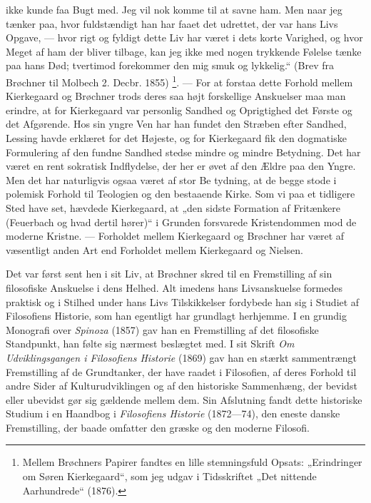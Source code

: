 \documentclass[12pt,a4paper,openany]{book}
\newcommand{\opage}[1]{\marginnote{\footnotesize\textit{[#1]}}}
\begin{document}
ikke kunde faa Bugt med. Jeg vil nok komme til at savne ham. Men naar jeg
tænker paa, hvor fuldstændigt han har faaet det udrettet, der var hans Livs
Opgave, --- hvor rigt og fyldigt dette Liv har været i dets korte Varighed, og
hvor Meget af ham der bliver tilbage, kan jeg ikke med nogen trykkende Følelse
tænke paa hans Død; tvertimod forekommer den mig smuk og lykkelig.“ (Brev fra
Brøchner til Molbech 2. Decbr. 1855)%
\footnote[1]{Mellem Brøchners Papirer fandtes en lille stemningsfuld Opsats:
„Erindringer om Søren Kierkegaard“, som jeg udgav i Tidsskriftet „Det nittende
Aarhundrede“ (1876).}. --- For at forstaa dette Forhold mellem Kierkegaard og
Brøchner trods deres saa højt forskellige Anskuelser maa man erindre, at for
Kierkegaard var personlig Sandhed og Oprigtighed det Første og det Afgørende.
Hos sin yngre Ven har han fundet den Stræben efter Sandhed, Lessing havde
erklæret for det Højeste, og for Kierkegaard fik den dogmatiske Formulering af
den fundne Sandhed stedse mindre og mindre Betydning. Det har været en rent
sokratisk Indflydelse, der her er øvet af den Ældre paa den Yngre. Men det har
naturligvis ogsaa været af stor Be%
\setcounter{footnote}{0}%
\opage{199}tydning, at de begge stode i polemisk Forhold til Teologien og den
bestaaende Kirke. Som vi paa et tidligere Sted have set, hævdede Kierkegaard,
at „den sidste Formation af Fritænkere (Feuerbach og hvad dertil hører)“ i
Grunden forsvarede Kristendommen mod de moderne Kristne. --- Forholdet mellem
Kierkegaard og Brøchner har været af væsentligt anden Art end Forholdet mellem
Kierkegaard og Nielsen.

Det var først sent hen i sit Liv, at Brøchner skred til en Fremstilling af sin
filosofiske Anskuelse i dens Helhed. Alt imedens hans Livsanskuelse formedes
praktisk og i Stilhed under hans Livs Tilskikkelser fordybede han sig i Studiet
af Filosofiens Historie, som han egentligt har grundlagt herhjemme. I en
grundig Monografi over \textit{Spinoza} (1857) gav han en Fremstilling af det
filosofiske Standpunkt, han følte sig nærmest beslægtet med. I sit Skrift
\textit{Om Udviklingsgangen i Filosofiens Historie} (1869) gav han en stærkt
sammentrængt Fremstilling af de Grundtanker, der have raadet i Filosofien, af
deres Forhold til andre Sider af Kulturudviklingen og af den historiske
Sammenhæng, der bevidst eller ubevidst gør sig gældende mellem dem. Sin
Afslutning fandt dette historiske Studium i en Haandbog i \textit{Filosofiens
Historie} (1872---74), den eneste danske Fremstilling, der baade omfatter den
græske og den moderne Filosofi.
\end{document}
